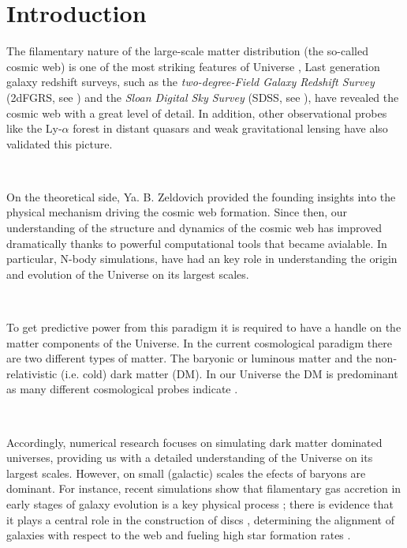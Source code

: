 \documentclass[a4,useAMS,usenatbib,usegraphicx,12pt]{article}
\begin{document}
\newpage

\section{Introduction}


The filamentary nature of the large-scale matter distribution (the so-called 
cosmic web) is one of the most striking features of Universe \citep{Bond96}, 
Last generation galaxy redshift surveys, such as the
\textit{two-degree-Field Galaxy  Redshift Survey} (2dFGRS, see
\citet{Colless03}) and the \textit{Sloan Digital  Sky Survey} (SDSS,
see \citet{Abazajian09}), have revealed the cosmic web with a great
level of detail. In addition, other observational probes like
the Ly-$\alpha$ forest in distant quasars \citep{Rauch98, Cantalupo14} and 
weak gravitational lensing \citep{Massey07, Dietrich12} have also validated 
this picture.

\

On the theoretical side, Ya. B. Zeldovich \citep{Zeldovich70} provided
the founding insights into the physical mechanism driving the cosmic
web formation. Since then, our understanding of the structure and
dynamics of the cosmic web  has improved dramatically thanks to
powerful computational tools that became avialable. In  particular,
N-body simulations, have had an key role in understanding the origin
and evolution of the Universe on its largest scales.

\

To get predictive power from this paradigm it is required to have a
handle on the matter components of the Universe. In the current
cosmological paradigm there are two different types of matter. The
baryonic or luminous matter and the non-relativistic 
(i.e. cold) dark matter (DM). In our Universe the DM is predominant as
many different cosmological probes indicate \citep{Planck13XVI}. 

\

Accordingly, numerical research focuses on simulating dark matter
dominated universes, providing us with a detailed
understanding of the Universe on its largest scales. However, on small
(galactic) scales the efects of baryons are dominant. For instance,
recent simulations show that filamentary gas accretion in early stages
of galaxy evolution is a key physical process \citep{Dekel09}; there
is evidence that it plays a central role in the construction of discs
\citep{Dubois14}, determining the alignment of galaxies with respect
to the web \citep{Hahn10} and fueling high star formation rates
\citep{Dekel09}.  
\end{document}
